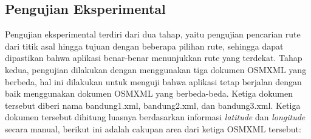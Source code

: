 \subsection{Pengujian Eksperimental}
Pengujian eksperimental terdiri dari dua tahap, yaitu pengujian pencarian rute
dari titik asal hingga tujuan dengan beberapa pilihan rute, sehingga dapat
dipastikan bahwa aplikasi benar-benar menunjukkan rute yang terdekat. Tahap 
kedua, pengujian dilakukan dengan menggunakan tiga dokumen OSMXML yang berbeda, 
hal ini dilakukan untuk menguji bahwa aplikasi tetap berjalan dengan baik 
menggunakan dokumen OSMXML yang berbeda-beda. Ketiga dokumen tersebut diberi
nama bandung1.xml, bandung2.xml, dan bandung3.xml. Ketiga dokumen tersebut dihitung 
luasnya berdasarkan informasi \textit{latitude} dan \textit{longitude} secara
manual, berikut ini adalah cakupan area dari ketiga OSMXML tersebut:
